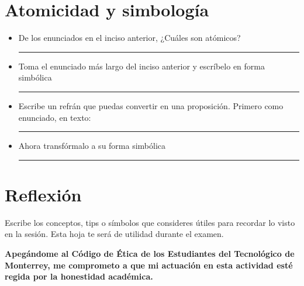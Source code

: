 \documentclass[spanish, 10pt]{article}
\newcommand{\responserule}{{\large\rule{14 cm}{0.3mm}}}
\begin{document}
\section{Atomicidad y simbología}

\begin{itemize}
    \itemsep2.5ex
    \item De los enunciados en el inciso anterior, ¿Cuáles son atómicos? \\[5ex] \responserule
    \item Toma el enunciado más largo del inciso anterior y escríbelo en forma simbólica\\[5ex] \responserule
    \item Escribe un refrán que puedas convertir en una proposición. Primero como enunciado, en texto:\\[5ex] \responserule
    \item Ahora transfórmalo a su forma simbólica \\[5ex] \responserule
\end{itemize}



\section{Reflexión}

Escribe los conceptos, tips o símbolos que consideres útiles para recordar lo visto en la sesión. Esta hoja te será de utilidad durante el examen.

\vfill

\textbf{Apegándome al Código de Ética de los Estudiantes del Tecnológico de Monterrey, me comprometo a que mi actuación en esta actividad esté regida por la honestidad académica.}
\end{document}
